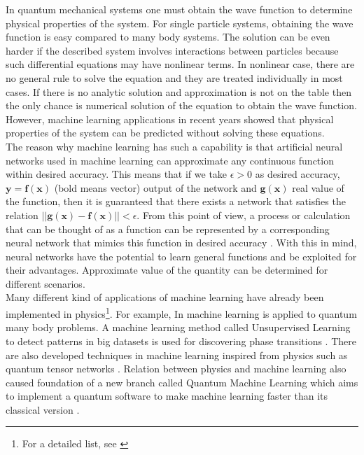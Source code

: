 \documentclass[a4paper,times,hidelinks,12pt]{article}
\begin{document}
In quantum mechanical systems one must obtain the wave function to determine physical properties of the system. For single particle systems, obtaining the wave function is easy compared to many body systems. The solution can be even harder if the described system involves interactions between particles because such differential equations may have nonlinear terms. In nonlinear case, there are no general rule to solve the equation and they are treated individually in most cases. If there is no analytic solution and approximation is not on the table then the only chance is numerical solution of the equation to obtain the wave function. However, machine learning applications in recent years showed that physical properties of the system can be predicted without solving these equations. \\

The reason why machine learning has such a capability is that artificial neural networks used in machine learning can approximate any continuous function within desired accuracy. This means that if we take $\epsilon > 0$ as desired accuracy,  $\boldsymbol{y} = \boldsymbol{f}(\boldsymbol{x})$ (bold means vector) output of the network and $\boldsymbol{g}(\boldsymbol{x})$ real value of the function, then it is guaranteed that there exists a network that satisfies the relation $||\boldsymbol{g}(\boldsymbol{x}) - \boldsymbol{f}(\boldsymbol{x})|| < \epsilon $. From this point of view, a process or calculation that can be thought of as a function can be represented by a corresponding neural network that mimics this function in desired accuracy \cite{nielsen2015neural}. With this in mind, neural networks have the potential to learn general functions and be exploited for their advantages. Approximate value of the quantity can be determined for different scenarios. \\

Many different kind of applications of machine learning have already been implemented in physics\footnote{For a detailed list, see \cite{physicsml}}. For example, In \cite{carleo2017solving, cai2017approximating} machine learning is applied to quantum many body problems. A machine learning method called Unsupervised Learning to detect patterns in big datasets is used for discovering phase transitions \cite{wang2016discovering}. There are also developed techniques in machine learning inspired from physics such as quantum tensor networks \cite{stoudenmire2016supervised}. Relation between physics and machine learning also caused foundation of a new branch called Quantum Machine Learning which aims to implement a quantum software to make machine learning faster than its classical version \cite{biamonte1611quantum}. \\
\end{document}
